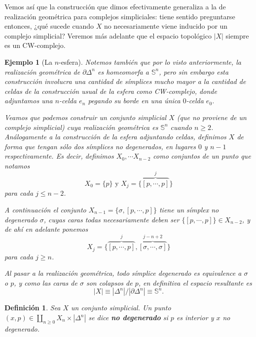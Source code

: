 \documentclass[11pt]{report}
\theoremstyle{colored}
\newtheorem{definition}{Definición}[section]
\newtheorem{example}{Ejemplo}[section]
\newcommand{\Ss}{\mathbb{S}}
\renewcommand{\ss}[1]{\Delta^{#1}}
\begin{document}
Vemos así que la construcción que dimos efectivamente generaliza a la de realización geométrica para complejos simpliciales: tiene sentido preguntarse entonces, ¿qué sucede cuando $X$ no necesariamente viene inducido por un complejo simplicial? Veremos más adelante que el espacio topológico $|X|$ siempre es un CW-complejo.

\begin{example}[La $n$-esfera] Notemos también que por lo visto anteriormente, la realización geométrica de $\partial \ss{n}$ es homeomorfa a $\Ss^n$, pero sin embargo esta construcción involucra una cantidad de símplices mucho mayor a la cantidad de celdas de la construcción usual de la esfera como CW-complejo, donde adjuntamos una $n$-celda $e_n$ pegando su borde en una única $0$-celda $e_0$. 

Veamos que podemos construir un conjunto simplicial $X$ (que no proviene de un complejo simplicial) cuya realización geométrica es $\Ss^n$ cuando $n \geq 2$. Análogamente a la construcción de la esfera adjuntando celdas, definimos $X$ de forma que tengan sólo dos símplices no degenerados, en lugares $0$ y $n-1$ respectivamente. Es decir, definimos $X_0,\cdots X_{n-2}$ como conjuntos de un punto que notamos 
\[X_0 = \{p\} \text{ y } X_j = \{\overbrace{[p,\cdots,p]}^j\}\]
para cada $j \leq n-2$. 

A continuación el conjunto $X_{n-1} = \{\sigma, [p,\cdots,p]\}$ tiene un símplex no degenerado $\sigma$, cuyas caras todas necesariamente deben ser $\{[p,\cdots,p]\} \in X_{n-2}$, y de ahí en adelante ponemos 
\[X_j = \{\overbrace{[p,\cdots,p]}^j, \overbrace{[\sigma,\cdots,\sigma]}^{j-n+2}\}\]
para cada $j \geq n$.

Al pasar a la realización geométrica, todo símplice degenerado es equivalence a $\sigma$ o $p$, y como las caras de $\sigma$ son colapsos de $p$, en definitiva el espacio resultante es
\[
|X| \equiv |\ss{n}|/|\partial \ss{n}| \equiv \Ss^n.
\]
\end{example}

\begin{definition} Sea $X$ un conjunto simplicial. Un punto $(x,p) \in \coprod_{n \geq 0} X_n \times |\ss{n}|$ se dice \textbf{no degenerado} si $p$ es interior y $x$ no degenerado.
\end{definition}
\end{document}
